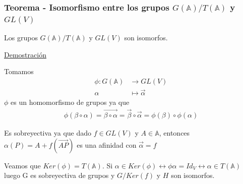 \documentclass[12pt, a4paper, ones, notitlepage, openany,titlepage]{article}
\newcommand{\demostracion}{\noindent\underline{Demostración}}
\begin{document}
\subsubsection{Teorema - Isomorfismo entre los grupos $G(\mathbb{A}) / T(\mathbb{A})$ y $G L(V)$}
\noindent Los grupos $G(\mathbb{A}) / T(\mathbb{A})$ y $G L(V)$ son isomorfos.

\demostracion

\noindent Tomamos
$$
\begin{aligned}
\phi: G(\mathbb{A}) & \longrightarrow G L(V) \\
\alpha & \longmapsto \vec{\alpha}
\end{aligned}
$$
\noindent $\phi$ es un homomorfismo de grupos ya que
$$
\begin{aligned}
	\phi(\beta\circ\alpha)=\overrightarrow{\beta\circ\alpha}=\vec{\beta}\circ\vec{\alpha}=\phi(\beta)\circ\phi(\alpha)
\end{aligned}
$$

Es sobreyectiva ya que dado $f\in GL(V)$ y $A\in\mathbb{A}$, entonces $\alpha(P) = A + f(\overrightarrow{AP})$ es una afinidad con $\vec{\alpha}=f$

Veamos que $Ker(\phi)=T(\mathbb{A})$. Si $\alpha\in Ker(\phi) \longleftrightarrow \phi{\alpha} = Id_{V} \longleftrightarrow \alpha\in T(\mathbb{A})$ luego G es sobreyectiva de grupos y $G/Ker(f)$ y $H$ son isomorfos.
\end{document}
